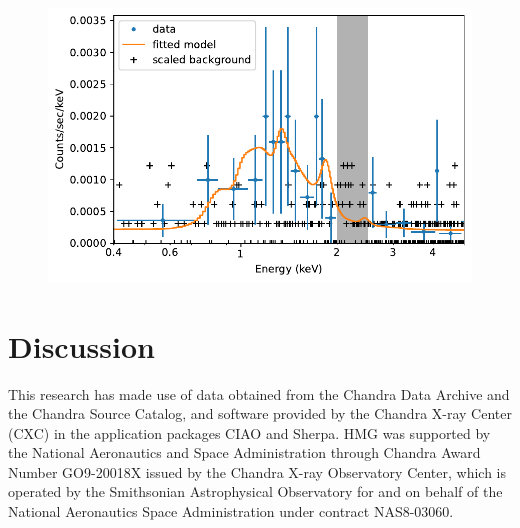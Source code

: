 \documentclass[linenumbers]{aastex631}
\begin{document}
\begin{figure}
    \centering
    \includegraphics[width=\textwidth]{figures/combined.pdf}
    \caption{}
    \label{fig:chandraimage}
\end{figure}

\section{Discussion}  \label{sec:discussion}

\begin{acknowledgements}
This research has made use of data obtained from the Chandra Data Archive and the Chandra Source Catalog, and software provided by the Chandra X-ray Center (CXC) in the application packages CIAO and Sherpa. 
HMG was supported by the National Aeronautics and Space Administration through Chandra Award Number GO9-20018X issued by the Chandra X-ray Observatory Center, which is operated by the Smithsonian Astrophysical Observatory for and on behalf of the National Aeronautics Space Administration under contract NAS8-03060.
\end{acknowledgements}



{}



\end{document}
